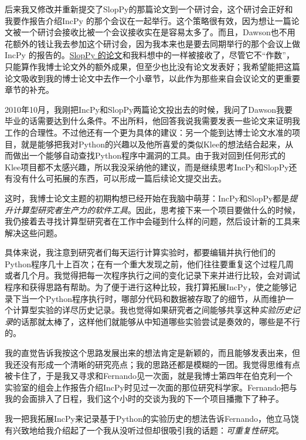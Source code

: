 \documentclass[letter,12pt]{book}
\begin{document}
\begin{CJK}{UTF8}{gbsn}
后来我又修改并重新提交了SlopPy的那篇论文到一个研讨会，这个研讨会正好和我要作报告介绍IncPy 的那个会议在一起举行。这个策略很有效，因为想让一篇论文被一个研讨会接收比被一个会议接收实在是容易太多了。而且，Dawson也不用花额外的钱让我去参加这个研讨会，因为我本来也是要去同期举行的那个会议上做IncPy 的报告的。\href{http://www.pgbovine.net/projects/pubs/guo_woda11_camera_ready.pdf}{SlopPy 的论文}和我料想中的一样被接收了，尽管它不“作数”，只能算作我博士论文外的额外成果，但至少也比没有论文发表好；我希望能把这篇论文吸收到我的博士论文中去作一个小章节，以此作为那些来自会议论文的更重要章节的补充。

\breakline

2010年10月，我刚把IncPy和SlopPy两篇论文投出去的时候，我问了Dawson我要毕业的话需要达到什么条件。不出所料，他回答我说我需要发表一些论文来证明我工作的合理性。不过他还有一个更为具体的建议：另一个能到达博士论文水准的项目，就是能够把我对Python的兴趣以及他所喜爱的类似Klee的想法结合起来，从而做出一个能够自动查找Python程序中漏洞的工具。由于我对回到任何形式的Klee项目都不太感兴趣，所以我没采纳他的建议，而是继续思考IncPy和SlopPy还有没有什么可拓展的东西，可以形成一篇后续论文提交出去。

这时，我博士论文主题的初期构想已经开始在我脑中萌芽：IncPy和SlopPy都是\emph{提升计算型研究者生产力的软件工具}。因此，思考接下来一个项目要做什么的时候，我仍接着去寻找计算型研究者在工作中会碰到什么样的问题，然后设计新的工具来解决这些问题。

具体来说，我注意到研究者们每天运行计算实验时，都要编辑并执行他们的Python程序几十上百次；在有一个重大发现之前，他们往往要重复这个过程几周或者几个月。我觉得把每一次程序执行之间的变化记录下来并进行比较，会对调试程序和获得思路有帮助。为了便于进行这种比较，我打算拓展IncPy，使之能够记录下当一个Python程序执行时，哪部分代码和数据被存取了的细节，从而维护一个计算型实验的详尽历史记录。我也觉得如果研究者之间能够共享这种\emph{实验历史记录}的话那就太棒了，这样他们就能够从中知道哪些实验尝试是奏效的，哪些是不行的。

我的直觉告诉我按这个思路发展出来的想法肯定是新颖的，而且能够发表出来，但我还没有形成一个清晰的研究亮点；我的思路还都是模糊的一团。我觉得思维有点被卡住了，于是我又寻求和Fernando见一次面，就是我博士第四年在伯克利一个实验室的组会上作报告介绍IncPy时见过一次面的那位研究科学家。Fernando把与我的会面排入了日程，我们这个小时的交谈为我的下一个项目播撒下了种子。

\breakline

我一把我拓展IncPy来记录基于Python的实验历史的想法告诉Fernando，他立马饶有兴致地给我介绍起了一个我从没听过但却很吸引我的话题：\emph{可重复性研究}。


\end{CJK}
\end{document}
